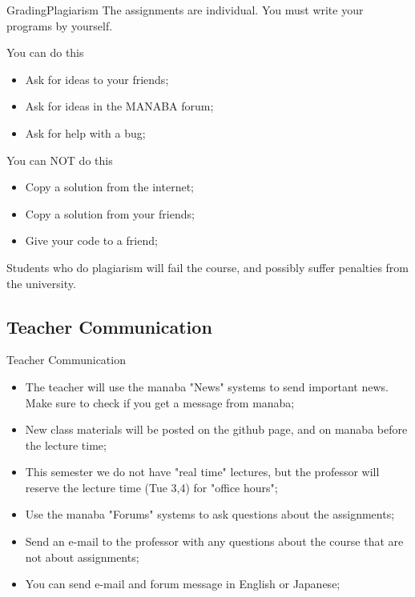 \begin{frame}{Grading}{Plagiarism}
  The assignments are \alert{individual}. You must write your
  programs by yourself.

  \begin{exampleblock}{You can do this}
    \begin{itemize}
    \item Ask for ideas to your friends;
    \item Ask for ideas in the MANABA forum;
    \item Ask for help with a bug;
    \end{itemize}
  \end{exampleblock}

  \begin{alertblock}{You can NOT do this}
    \begin{itemize}
    \item Copy a solution from the internet;
    \item Copy a solution from your friends;
    \item Give your code to a friend;
    \end{itemize}
  \end{alertblock}

  Students who do plagiarism will fail the course, and possibly
  suffer penalties from the university.
\end{frame}

\subsection{Teacher Communication}
\begin{frame}{Teacher Communication}
  \begin{itemize}
    \item The teacher will use the manaba "News" systems to send important news. Make sure to check if you get a message from manaba;
    \medskip
    \item New class materials will be posted on the github page, and on manaba before the lecture time;
    \medskip
    \item This semester we do not have "real time" lectures, but the professor will reserve the lecture time (Tue 3,4) for "office hours";
    \medskip
    \item Use the manaba "Forums" systems to ask questions about the assignments;
    \medskip
    \item Send an e-mail to the professor with any questions about the course that are not about assignments;
    \medskip
    \item You can send e-mail and forum message in English or Japanese;
  \end{itemize}
\end{frame}

